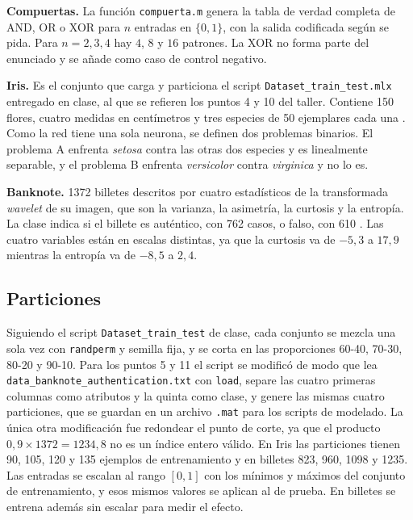 \documentclass[conference]{IEEEtran}
\begin{document}
\textbf{Compuertas.} La funci\'on \texttt{compuerta.m} genera la tabla de verdad completa de AND, OR o XOR para $n$ entradas en $\{0,1\}$, con la salida codificada seg\'un se pida. Para $n = 2, 3, 4$ hay $4$, $8$ y $16$ patrones. La XOR no forma parte del enunciado y se a\~nade como caso de control negativo.

\textbf{Iris.} Es el conjunto que carga y particiona el script \texttt{Dataset\_train\_test.mlx} entregado en clase, al que se refieren los puntos 4 y 10 del taller. Contiene 150 flores, cuatro medidas en cent\'imetros y tres especies de 50 ejemplares cada una \cite{fisher1936}. Como la red tiene una sola neurona, se definen dos problemas binarios. El problema A enfrenta \textit{setosa} contra las otras dos especies y es linealmente separable, y el problema B enfrenta \textit{versicolor} contra \textit{virginica} y no lo es.

\textbf{Banknote.} 1372 billetes descritos por cuatro estad\'isticos de la transformada \textit{wavelet} de su imagen, que son la varianza, la asimetr\'ia, la curtosis y la entrop\'ia. La clase indica si el billete es aut\'entico, con 762 casos, o falso, con 610 \cite{lohweg2013}. Las cuatro variables est\'an en escalas distintas, ya que la curtosis va de $-5{,}3$ a $17{,}9$ mientras la entrop\'ia va de $-8{,}5$ a $2{,}4$.

\subsection{Particiones}

Siguiendo el script \texttt{Dataset\_train\_test} de clase, cada conjunto se mezcla una sola vez con \texttt{randperm} y semilla fija, y se corta en las proporciones 60-40, 70-30, 80-20 y 90-10. Para los puntos 5 y 11 el script se modific\'o de modo que lea \texttt{data\_banknote\_authentication.txt} con \texttt{load}, separe las cuatro primeras columnas como atributos y la quinta como clase, y genere las mismas cuatro particiones, que se guardan en un archivo \texttt{.mat} para los scripts de modelado. La \'unica otra modificaci\'on fue redondear el punto de corte, ya que el producto $0{,}9 \times 1372 = 1234{,}8$ no es un \'indice entero v\'alido. En Iris las particiones tienen 90, 105, 120 y 135 ejemplos de entrenamiento y en billetes 823, 960, 1098 y 1235. Las entradas se escalan al rango $[0,1]$ con los m\'inimos y m\'aximos del conjunto de entrenamiento, y esos mismos valores se aplican al de prueba. En billetes se entrena adem\'as sin escalar para medir el efecto.
\end{document}
